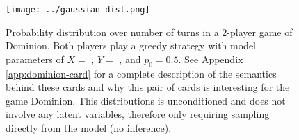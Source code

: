 

\begin{figure}
\texttt{[image: ../gaussian-dist.png]}
\caption{\label{fig:turn-dist} Probability distribution over number of turns
in a 2-player game of Dominion.
Both players play a greedy strategy with model
parameters of $X =$ , $Y =$ , and
$p_0 = 0.5$. See Appendix \ref{app:dominion-card} for a complete description
of the semantics behind these cards and why this pair of cards is interesting
for the game Dominion.
This distributions is unconditioned and does not involve any latent variables,
therefore only requiring sampling directly from the model (no inference).
}\end{figure}

